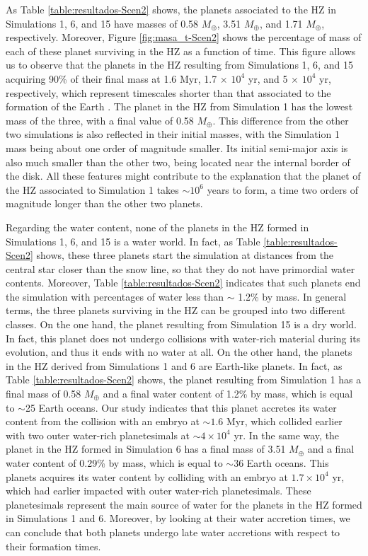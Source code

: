 \documentclass{aa}
\begin{document}
As Table \ref{table:resultados-Scen2} shows, the planets associated to the HZ in Simulations 1, 6, and 15 have masses of
0.58 $M_\oplus$, 3.51 $M_\oplus$, and 1.71 $M_\oplus$, respectively. Moreover, Figure \ref{fig:masa_t-Scen2} shows the
percentage of mass of each of these planet surviving in the HZ as a function of time. This figure allows us to observe
that the planets in the HZ resulting from Simulations 1, 6, and 15 acquiring 90\% of their final mass at 1.6 Myr,
1.7 $\times$ $10^{4}$ yr, and 5 $\times$ $10^{4}$ yr, respectively, which represent timescales shorter than that associated
to the formation of the Earth \citep{Jacobson2014}.
The planet in the HZ from Simulation 1 has the lowest mass of the three, with a final value of 0.58 $M_\oplus$. This difference from the other two simulations is also reflected in their initial masses, with the Simulation 1 mass being about one order of magnitude smaller. Its initial
semi-major axis is also much smaller than the other two, being located near the internal border of the disk. All these features might
contribute to the explanation that the planet of the HZ associated to Simulation 1 takes $\sim 10^6$ years to form, a time two orders of magnitude longer than
the other two planets. 

Regarding the water content, none of the planets in the HZ formed in Simulations 1, 6, and 15
is a water world. In fact, as Table \ref{table:resultados-Scen2} shows, these three planets start the simulation at
distances from the central star closer than the snow line, so that they do not have primordial water contents. Moreover,
Table \ref{table:resultados-Scen2} indicates that such planets end the simulation with percentages of water less than $\sim$
1.2\% by mass.
In general terms, the three planets surviving in the HZ can be grouped into two different classes. On the one hand, the planet
resulting from Simulation 15 is a dry world. In fact, this planet does not undergo collisions with water-rich material during
its evolution, and thus it ends with no water at all. On the other hand, the planets in the HZ derived from Simulations 1 and 6
are Earth-like planets. In fact, as Table \ref{table:resultados-Scen2} shows, the planet resulting from Simulation 1
has a final mass of 0.58 $M_\oplus$ and a final water content of 1.2\% by mass, which is equal to $\sim$25 Earth oceans.
Our study indicates that this planet accretes its water content from the collision with an embryo at $\sim 1.6$ Myr,
which collided earlier with two outer water-rich planetesimals at $\sim 4 \times 10^4$ yr. In the same way,
the planet in the HZ formed in Simulation 6 has a final mass of 3.51 $M_\oplus$ and a final water content of 0.29\% by mass,
which is equal to $\sim$36 Earth oceans. This planets acquires its water content by colliding with an embryo at $1.7 \times 10^4$ yr,
which had earlier impacted with outer water-rich planetesimals. These planetesimals represent the main source
of water for the planets in the HZ formed in Simulations 1 and 6. Moreover, by looking at their water accretion
times, we can conclude that both planets undergo late water accretions with respect to their formation times.
\end{document}
